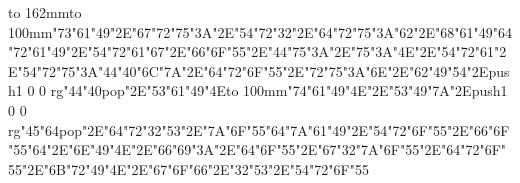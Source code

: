 \hbox to 162mm{\hsize=69mm\vbox to 100mm{\vfill\ipa\char"73\ipa\char"61\ipa\char"49\ipa\char"2E\ipa\char"67\ipa\char"72\ipa\char"75\ipa\char"3A\ipa\char"2E\ipa\char"54\ipa\char"72\ipa\char"32\ipa\char"2E\ipa\char"64\ipa\char"72\ipa\char"75\ipa\char"3A\ipa\char"62\ipa\char"2E\ipa\char"68\ipa\char"61\ipa\char"49\medskip\ipa\char"64\ipa\char"72\ipa\char"61\ipa\char"49\ipa\char"2E\ipa\char"54\ipa\char"72\ipa\char"61\ipa\char"67\ipa\char"2E\ipa\char"66\ipa\char"6F\ipa\char"55\ipa\char"2E\ipa\char"44\ipa\char"75\ipa\char"3A\ipa\char"2E\ipa\char"75\ipa\char"3A\ipa\char"4E\ipa\char"2E\ipa\char"54\ipa\char"72\ipa\char"61\ipa\char"2E\ipa\char"54\ipa\char"72\ipa\char"75\ipa\char"3A\medskip\ipa\char"44\ipa\char"40\ipa\char"6C\ipa\char"7A\ipa\char"2E\ipa\char"64\ipa\char"72\ipa\char"6F\ipa\char"55\ipa\char"2E\ipa\char"72\ipa\char"75\ipa\char"3A\ipa\char"6E\ipa\char"2E\ipa\char"62\ipa\char"49\ipa\char"54\ipa\char"2E\pdfcolorstack\match push{1 0 0 rg}\ipa\char"44\ipa\char"40\pdfcolorstack\match pop{}\ipa\char"2E\ipa\char"53\ipa\char"61\ipa\char"49\ipa\char"4E\vfill}\hfill\vbox to 100mm{\vfill\ipa\char"74\ipa\char"61\ipa\char"49\ipa\char"4E\ipa\char"2E\ipa\char"53\ipa\char"49\ipa\char"7A\ipa\char"2E\pdfcolorstack\match push{1 0 0 rg}\ipa\char"45\ipa\char"64\pdfcolorstack\match pop{}\ipa\char"2E\ipa\char"64\ipa\char"72\ipa\char"32\ipa\char"53\ipa\char"2E\ipa\char"7A\ipa\char"6F\ipa\char"55\ipa\char"64\medskip\ipa\char"7A\ipa\char"61\ipa\char"49\ipa\char"2E\ipa\char"54\ipa\char"72\ipa\char"6F\ipa\char"55\ipa\char"2E\ipa\char"66\ipa\char"6F\ipa\char"55\ipa\char"64\ipa\char"2E\ipa\char"6E\ipa\char"49\ipa\char"4E\ipa\char"2E\ipa\char"66\ipa\char"69\ipa\char"3A\ipa\char"2E\ipa\char"64\ipa\char"6F\ipa\char"55\ipa\char"2E\ipa\char"67\ipa\char"32\medskip\ipa\char"7A\ipa\char"6F\ipa\char"55\ipa\char"2E\ipa\char"64\ipa\char"72\ipa\char"6F\ipa\char"55\ipa\char"2E\ipa\char"6B\ipa\char"72\ipa\char"49\ipa\char"4E\ipa\char"2E\ipa\char"67\ipa\char"6F\ipa\char"66\ipa\char"2E\ipa\char"32\ipa\char"53\ipa\char"2E\ipa\char"54\ipa\char"72\ipa\char"6F\ipa\char"55\vfill}}\eject
